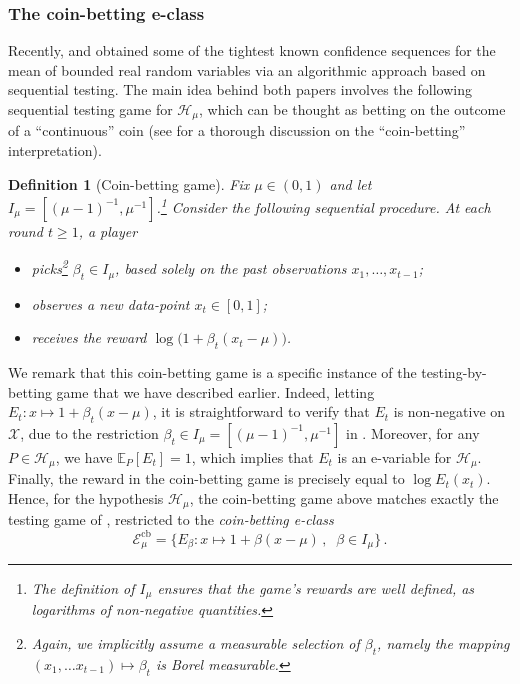 \documentclass[3p, authoryear, 10pt]{elsarticle}%
\newcommand{\E}{\mathbb E}
\newcommand{\Ecb}{\mathcal E^{\mathrm{cb}}}
\newcommand{\Hh}{\mathcal H}
\newcommand{\X}{\mathcal X}
\newtheorem{definition}{Definition}
\begin{document}
\subsubsection{The coin-betting e-class}

Recently, \cite{orabona2023tight} and \cite{waudbysmith23estimating} obtained some of the tightest known confidence sequences for the mean of bounded real random variables via an algorithmic approach based on sequential testing. The main idea behind both papers involves the following sequential testing game for $\Hh_\mu$, which can be thought as betting on the outcome of a ``continuous'' coin (see \citealt{orabona2023tight} for a thorough discussion on the ``coin-betting'' interpretation). 
\begin{definition}[Coin-betting game]\label{def:coin}
    Fix $\mu\in(0,1)$ and let $I_\mu=[(\mu-1)^{-1}, \mu^{-1}]$.\footnote{The definition of $I_\mu$ ensures that the game's rewards are well defined, as logarithms of non-negative quantities.} Consider the following sequential procedure. At each round $t\geq 1$, a player 
    \begin{itemize}\setlength{\itemsep}{0pt}
        \item picks\footnote{Again, we implicitly assume a measurable selection of $\beta_t$, namely the mapping $(x_1,\dots x_{t-1})\mapsto \beta_t$ is Borel measurable.} $\beta_t\in I_\mu$, based solely on the past observations $x_1,\dots, x_{t-1}$;
        \item observes a new data-point $x_t\in[0,1]$;
        \item receives the reward $\log \big(1+\beta_t(x_t-\mu)\big)$. 
    \end{itemize}
\end{definition}
We remark that this coin-betting game is a specific instance of the testing-by-betting game that we have  described earlier. Indeed, letting $E_t : x \mapsto 1 + \beta_t(x-\mu)$, it is straightforward to verify that $E_t$ is non-negative on $\X$, due to the restriction $\beta_t \in I_\mu=[(\mu-1)^{-1}, \mu^{-1}]$ in . Moreover, for any $P \in \mathcal{H}_\mu$, we have $\E_P[ E_t ] = 1$, which implies that $E_t$ is an e-variable for $\Hh_\mu$. Finally, the reward in the coin-betting game is precisely equal to $\log E_t(x_t)$. Hence, for the hypothesis $\Hh_\mu$, the coin-betting game above matches exactly the testing game of , restricted to the \textit{coin-betting e-class}
\begin{equation}\label{eq:Ecb}\Ecb_\mu = \big\{E_\beta:x\mapsto 1+\beta(x-\mu)\,,\;\;\beta\in I_\mu\big\}\,.\end{equation}
\end{document}
